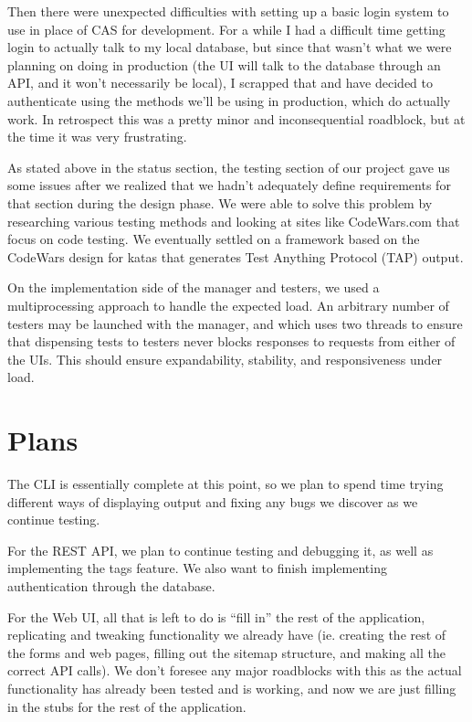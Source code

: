 \documentclass[10pt,draftclsnofoot,onecolumn]{IEEEtran}
\begin{document}
Then there were unexpected difficulties with setting up a basic login system to
use in place of CAS for development.  For a while I had a difficult time
getting login to actually talk to my local database, but since that wasn’t what
we were planning on doing in production (the UI will talk to the database
through an API, and it won’t necessarily be local), I scrapped that and have
decided to authenticate using the methods we’ll be using in production, which
do actually work.  In retrospect this was a pretty minor and inconsequential
roadblock, but at the time it was very frustrating.

As stated above in the status section, the testing section of our project gave
us some issues after we realized that we hadn’t adequately define requirements
for that section during the design phase. We were able to solve this problem by
researching various testing methods and looking at sites like CodeWars.com that
focus on code testing. We eventually settled on a framework based on the
CodeWars design for katas that generates Test Anything Protocol (TAP) output.

On the implementation side of the manager and testers, we used a
multiprocessing approach to handle the expected load. An arbitrary number of
testers may be launched with the manager, and which uses two threads to ensure
that dispensing tests to testers never blocks responses to requests from either
of the UIs. This should ensure expandability, stability, and responsiveness
under load.

\section{Plans}

The CLI is essentially complete at this point, so we plan to spend time trying
different ways of displaying output and fixing any bugs we discover as we
continue testing.

For the REST API, we plan to continue testing and debugging it, as well as
implementing the tags feature. We also want to finish implementing
authentication through the database.


For the Web UI, all that is left to do is “fill in” the rest of the
application, replicating and tweaking functionality we already have (ie.
creating the rest of the forms and web pages, filling out the sitemap
structure, and making all the correct API calls).  We don’t foresee any major
roadblocks with this as the actual functionality has already been tested and is
working, and now we are just filling in the stubs for the rest of the
application.
\end{document}
